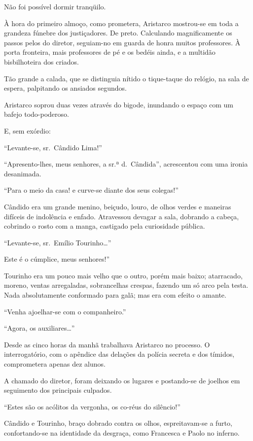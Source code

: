 Não foi possível dormir tranqüilo. 

À hora do primeiro almoço, como
prometera, Aristarco mostrou{}-se em toda a grandeza fúnebre dos
justiçadores. De preto. Calculando magnificamente os passos pelos do
diretor, seguiam{}-no em guarda de honra muitos professores. À porta
fronteira, mais professores de pé e os bedéis ainda, e a multidão
bisbilhoteira dos criados. 

Tão grande a calada, que se distinguia
nítido o tique{}-taque do relógio, na sala de espera, palpitando os
ansiados segundos. 

Aristarco soprou duas vezes através do bigode,
inundando o espaço com um bafejo todo{}-poderoso. 

E, sem exórdio:

``Levante{}-se, sr.~Cândido Lima!'' 

``Apresento{}-lhes, meus senhores, a
sr.ª d.~Cândida'', acrescentou com uma ironia desanimada. 

``Para o meio da casa! e curve{}-se diante dos seus colegas!'' 

Cândido era um grande
menino, beiçudo, louro, de olhos verdes e maneiras difíceis de
indolência e enfado. Atravessou devagar a sala, dobrando a cabeça,
cobrindo o rosto com a manga, castigado pela curiosidade pública.

``Levante{}-se, sr.~Emílio Tourinho\ldots'' 

Este é o cúmplice, meus senhores!'' 

Tourinho era um pouco mais velho que o outro, porém mais
baixo; atarracado, moreno, ventas arregaladas, sobrancelhas crespas,
fazendo um só arco pela testa. Nada absolutamente conformado para galã;
mas era com efeito o amante. 

``Venha ajoelhar{}-se com o companheiro.''

``Agora, os auxiliares\ldots'' 

Desde as cinco horas da manhã trabalhava
Aristarco no processo. O interrogatório, com o apêndice das delações da
polícia secreta e dos tímidos, comprometera apenas dez alunos. 

A chamado do diretor, foram deixando os lugares e postando{}-se de
joelhos em seguimento dos principais culpados. 

``Estes são os acólitos da vergonha, os co{}-réus do silêncio!'' 

Cândido e Tourinho, braço
dobrado contra os olhos, espreitavam{}-se a furto, confortando{}-se na
identidade da desgraça, como Francesca e Paolo no inferno. 


